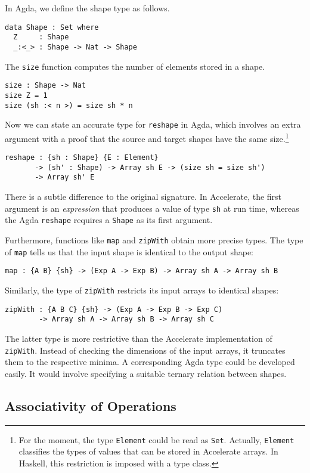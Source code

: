 \documentclass{llncs}
\begin{document}
In Agda, we define the shape type as follows.
\begin{verbatim}
data Shape : Set where
  Z     : Shape
  _:<_> : Shape -> Nat -> Shape
\end{verbatim}
The \texttt{size} function computes the number of elements stored in a
shape.
\begin{verbatim}
size : Shape -> Nat
size Z = 1
size (sh :< n >) = size sh * n
\end{verbatim}
Now we can state an accurate type for \texttt{reshape} in Agda, which
involves an extra argument with a proof that the source and
target shapes have the same size.\footnote{For the moment, the type
  \texttt{Element} could be read as \texttt{Set}. Actually,
  \texttt{Element} classifies the types of values that can be stored
  in Accelerate arrays. In Haskell, this restriction is imposed with a
  type class.}
\begin{verbatim}
reshape : {sh : Shape} {E : Element}
       -> (sh' : Shape) -> Array sh E -> (size sh = size sh')
       -> Array sh' E
\end{verbatim}
There is a subtle difference to the original signature. In
Accelerate, the first argument is an \emph{expression} that produces a
value of type \texttt{sh} at run time, whereas the Agda
\texttt{reshape} requires a \texttt{Shape} as its first argument.


Furthermore, functions like \texttt{map} and \texttt{zipWith} obtain
more precise types. The type of \texttt{map} tells us that the input
shape is identical to the output shape:
\begin{verbatim}
map : {A B} {sh} -> (Exp A -> Exp B) -> Array sh A -> Array sh B
\end{verbatim}
Similarly, the type of \texttt{zipWith} restricts its input arrays to
identical shapes:
\begin{verbatim}
zipWith : {A B C} {sh} -> (Exp A -> Exp B -> Exp C)
        -> Array sh A -> Array sh B -> Array sh C
\end{verbatim}
The latter type is more restrictive than the Accelerate
implementation of \texttt{zipWith}. Instead of checking the dimensions
of the input arrays, it truncates them to the respective minima. A
corresponding Agda type could be developed easily. It would involve
specifying a suitable ternary relation between shapes.

\subsection{Associativity of Operations}
\label{sec:assoc-oper}
\end{document}
